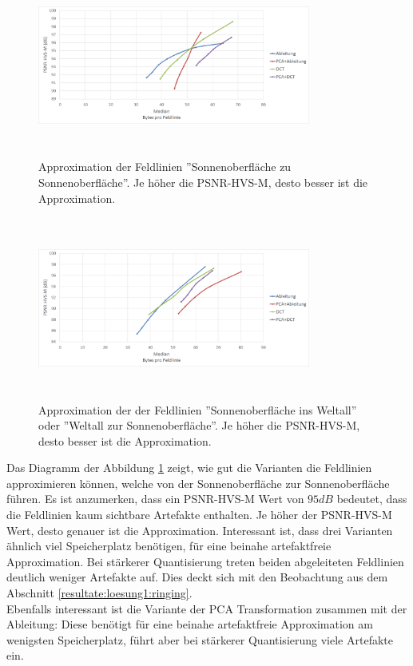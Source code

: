 \begin{figure}[!htbp]
	\center	\includegraphics[width=0.8\textwidth,height=6cm,keepaspectratio]{./pictures/resultate/loesung1/ringing/sts.png}
	\caption{Approximation der Feldlinien ''Sonnenoberfläche zu Sonnenoberfläche''. Je höher die PSNR-HVS-M, desto besser ist die Approximation. }	\label{resultate:loesung1:dct:behandlung_ringing:sts}
\end{figure} 
\begin{figure}[!htbp]
	\center
\includegraphics[width=0.8\textwidth,height=6cm,keepaspectratio]{./pictures/resultate/loesung1/ringing/nosts.png}
	\caption{Approximation der der Feldlinien ''Sonnenoberfläche ins Weltall'' oder ''Weltall zur Sonnenoberfläche''. Je höher die PSNR-HVS-M, desto besser ist die Approximation.}	\label{resultate:loesung1:dct:behandlung_ringing:nosts}
\end{figure}
Das Diagramm der Abbildung \ref{resultate:loesung1:dct:behandlung_ringing:sts} zeigt, wie gut die Varianten die Feldlinien approximieren können, welche von der Sonnenoberfläche zur Sonnenoberfläche führen. Es ist anzumerken, dass ein PSNR-HVS-M Wert von $95 dB$ bedeutet, dass die Feldlinien kaum sichtbare Artefakte enthalten. Je höher der PSNR-HVS-M Wert, desto genauer ist die Approximation. Interessant ist, dass drei Varianten ähnlich viel Speicherplatz benötigen, für eine beinahe artefaktfreie Approximation. Bei stärkerer Quantisierung treten beiden abgeleiteten Feldlinien deutlich weniger Artefakte auf. Dies deckt sich mit den Beobachtung aus dem Abschnitt \ref{resultate:loesung1:ringing}.\\
Ebenfalls interessant ist die Variante der PCA Transformation zusammen mit der Ableitung: Diese benötigt für eine beinahe artefaktfreie Approximation am wenigsten Speicherplatz, führt aber bei stärkerer Quantisierung viele Artefakte ein.


